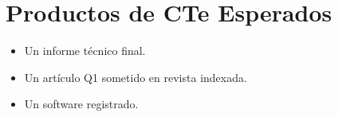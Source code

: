 \section{Productos de CTe Esperados}

\begin{itemize}
	\item Un informe técnico final.
	\item Un artículo Q1 sometido en revista indexada.
	\item Un software registrado.
\end{itemize}